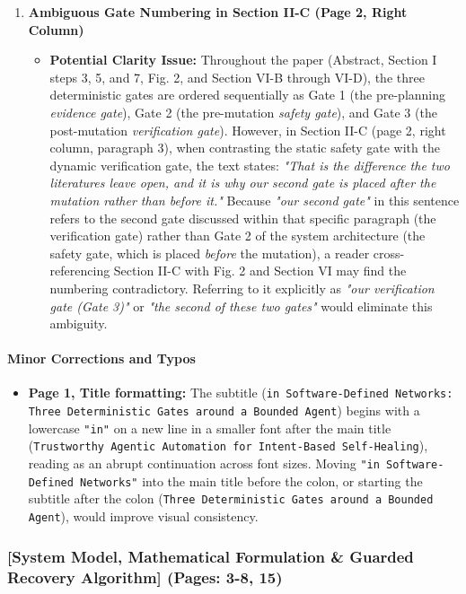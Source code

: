 \documentclass[11pt,a4paper]{article}
\begin{document}
\begin{enumerate}[leftmargin=1.6em,itemsep=3pt]
\item \textbf{Ambiguous Gate Numbering in Section II-C (Page 2, Right Column)}
\begin{itemize}[leftmargin=1.8em,itemsep=2pt]
\item \textbf{Potential Clarity Issue:} Throughout the paper (Abstract, Section I steps 3, 5, and 7, Fig. 2, and Section VI-B through VI-D), the three deterministic gates are ordered sequentially as Gate 1 (the pre-planning \emph{evidence gate}), Gate 2 (the pre-mutation \emph{safety gate}), and Gate 3 (the post-mutation \emph{verification gate}). However, in Section II-C (page 2, right column, paragraph 3), when contrasting the static safety gate with the dynamic verification gate, the text states: \emph{"That is the difference the two literatures leave open, and it is why our second gate is placed after the mutation rather than before it."} Because \emph{"our second gate"} in this sentence refers to the second gate discussed within that specific paragraph (the verification gate) rather than Gate 2 of the system architecture (the safety gate, which is placed \emph{before} the mutation), a reader cross-referencing Section II-C with Fig. 2 and Section VI may find the numbering contradictory. Referring to it explicitly as \emph{"our verification gate (Gate 3)"} or \emph{"the second of these two gates"} would eliminate this ambiguity.
\end{itemize}
\end{enumerate}
\paragraph{Minor Corrections and Typos}
\begin{itemize}[leftmargin=1.8em,itemsep=2pt]
\item \textbf{Page 1, Title formatting:} The subtitle (\texttt{in Software-Defined Networks: Three Deterministic Gates around a Bounded Agent}) begins with a lowercase \texttt{"in"} on a new line in a smaller font after the main title (\texttt{Trustworthy Agentic Automation for Intent-Based Self-Healing}), reading as an abrupt continuation across font sizes. Moving \texttt{"in Software-Defined Networks"} into the main title before the colon, or starting the subtitle after the colon (\texttt{Three Deterministic Gates around a Bounded Agent}), would improve visual consistency.
\end{itemize}
\subsubsection*{[System Model, Mathematical Formulation \& Guarded Recovery Algorithm] (Pages: 3-8, 15)}
\end{document}
